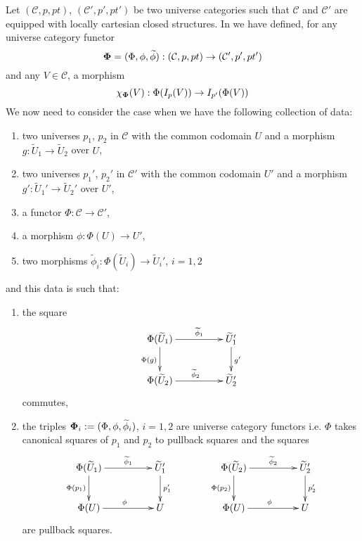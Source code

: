 \documentclass[12pt]{article}
\numberwithin{equation}{section}
\newcommand{\sr}{\rightarrow}
\newcommand{\wt}{\widetilde}
\newcommand{\spc}{{\,\,\,\,\,\,\,}}
\begin{document}
Let $({\mathcal C},p,pt)$, $({\mathcal C}',p',pt')$ be two universe categories
such that $\mathcal C$ and $\mathcal C'$ are equipped with locally cartesian
closed structures. In \cite[Construction 5.6]{fromunivwithPi} we have defined,
for any universe category functor
%
$${\bf\Phi}=(\Phi,\phi,\wt{\phi}):({\mathcal C},p,pt)\sr ({\mathcal
  C}',p',pt')$$
%
and any $V\in {\mathcal C}$, a morphism
%
$$\chi_{\bf\Phi}(V):\Phi(I_p(V))\sr I_{p'}(\Phi(V))$$
%
We now need to consider the case when we have the following collection of data:
%
\begin{enumerate}
\item two universes $p_1$, $p_2$ in $\mathcal C$ with the common codomain $U$
  and a morphism $g:\wt{U}_1\sr \wt{U}_2$ over $U$,
\item two universes $p_1'$, $p_2'$ in $\mathcal C'$ with the common codomain
  $U'$ and a morphism $g':\wt{U}_1'\sr \wt{U}_2'$ over $U'$,
\item a functor $\Phi:{\mathcal C}\sr {\mathcal C}'$,
\item a morphism $\phi:\Phi(U)\sr U'$,
\item two morphisms $\wt{\phi}_i:\Phi(\wt{U}_i)\sr \wt{U}_i'$, $i=1,2$
\end{enumerate}
%
and this data is such that:
%
\begin{enumerate}
\item the square
%
$$
\begin{xy}
          \xymatrix@C=4pc{ \Phi(\wt{U}_1) \ar[r]^-{\wt{\phi}_1}
            \ar[d]_{\Phi(g)} & \wt{U}_1' \ar[d]^{g'}\\ \Phi(\wt{U}_2)
            \ar[r]^{\wt{\phi}_2} & \wt{U}_2' }
\end{xy}
$$
%
commutes,
%
\item the triples ${\bf\Phi}_i:=(\Phi,\phi,\wt{\phi}_i)$, $i=1,2$ are universe
  category functors i.e.  $\Phi$ takes canonical squares of $p_1$ and $p_2$ to
  pullback squares and the squares
%
$$
\begin{xy}
          \xymatrix@C=4pc{ \Phi(\wt{U}_1) \ar[r]^-{\wt{\phi}_1}
            \ar[d]_{\Phi(p_1)} & \wt{U}_1' \ar[d]^{p_1'}\\ \Phi(U)
            \ar[r]^{\phi} & U }
\end{xy}
\spc\spc\spc
\begin{xy}
          \xymatrix@C=4pc{ \Phi(\wt{U}_2) \ar[r]^-{\wt{\phi}_2}
            \ar[d]_{\Phi(p_2)} & \wt{U}_2' \ar[d]^{p_2'}\\ \Phi(U)
            \ar[r]^{\phi} & U }
\end{xy}
$$
%
are pullback squares.
\end{enumerate}
\end{document}
